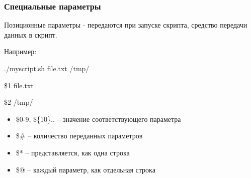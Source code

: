 \begin{frame}
	\frametitle{Специальные параметры}

	Позиционные параметры - передаются при запуске скрипта, средство передачи данных в скрипт.

        Например: 

        ./myscript.sh file.txt /tmp/

        \$1 file.txt

        \$2 /tmp/
        
	\begin{itemize}
		\item \alert{ \$0-9, \$\{10\}}..  -- значение соответствующего параметра
		\item \alert{\$\#} -- количество переданных параметров
		\item \alert{\$*} -- представляется, как одна строка
		\item \alert{\$@} -- каждый параметр, как отдельная строка
	\end{itemize}

\end{frame}


%
%
%
%
%


%
%

